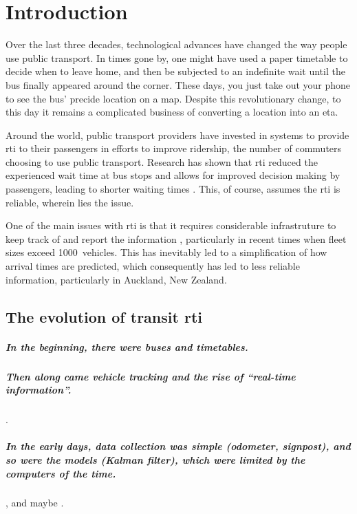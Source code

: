 
\chapter{Introduction}
\label{cha:intro}

Over the last three decades, technological advances have changed the way people use public transport. In times gone by, one might have used a paper timetable to decide when to leave home, and then be subjected to an indefinite wait until the bus finally appeared around the corner. These days, you just take out your phone to see the bus' precide location on a map. Despite this revolutionary change, to this day it remains a complicated business of converting a location into an \gls{eta}.


Around the world, public transport providers have invested in systems to provide \gls{rti} to their passengers in efforts to improve ridership, the number of commuters choosing to use public transport. Research has shown that \gls{rti} reduced the experienced wait time at bus stops \citep{TCRP_2003} and allows for improved decision making by passengers, leading to shorter waiting times \citep{Cats_2015,Lu_2017}. This, of course, assumes the \gls{rti} is reliable, wherein lies the issue.


One of the main issues with \gls{rti} is that it requires considerable infrastruture to keep track of and report the information \citep{TCRP_2003b}, particularly in recent times when fleet sizes exceed 1000~vehicles. This has inevitably led to a simplification of how arrival times are predicted, which consequently has led to less reliable information, particularly in Auckland, New Zealand.


\section{The evolution of transit \gls{rti}}
\label{sec:literature}

\paragraph{In the beginning, there were buses and timetables.}


\paragraph{Then along came vehicle tracking and the rise of ``real-time information''.}
\cite{TCRP_1997}.


\paragraph{In the early days, data collection was simple (odometer, signpost), and so were the models (Kalman filter), which were limited by the computers of the time.}
\cite{TCRP_1997,TCRP_2003,Wall_1999,Reinhoudt_1997},
and maybe \cite{Dailey_2001}.


